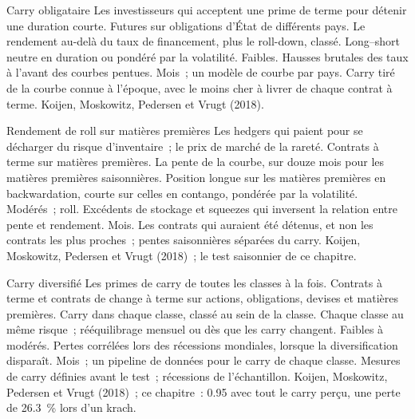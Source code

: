 \begin{strategyfile}{Carry obligataire}\label{strat:s1:carry-across-asset-classes:bond}
 Les investisseurs qui acceptent une prime de terme pour détenir une duration courte.
 Futures sur obligations d'État de différents pays.
 Le rendement au-delà du taux de financement, plus le roll-down, classé.
 Long--short neutre en duration ou pondéré par la volatilité.
 Faibles.
 Hausses brutales des taux à l'avant des courbes pentues.
 Mois~; un modèle de courbe par pays.
 Carry tiré de la courbe connue à l'époque, avec le moins cher à livrer de chaque contrat à terme.
 Koijen, Moskowitz, Pedersen et Vrugt (2018).
\end{strategyfile}

\begin{strategyfile}{Rendement de roll sur matières premières}\label{strat:s1:carry-across-asset-classes:commodity}
 Les hedgers qui paient pour se décharger du risque d'inventaire~; le prix de marché de la rareté.
 Contrats à terme sur matières premières.
 La pente de la courbe, sur douze mois pour les matières premières saisonnières.
 Position longue sur les matières premières en backwardation, courte sur celles en contango, pondérée par la volatilité.
 Modérés~; roll.
 Excédents de stockage et squeezes qui inversent la relation entre pente et rendement.
 Mois.
 Les contrats qui auraient été détenus, et non les contrats les plus proches~; pentes saisonnières séparées du carry.
 Koijen, Moskowitz, Pedersen et Vrugt (2018)~; le test saisonnier de ce chapitre.
\end{strategyfile}

\begin{strategyfile}{Carry diversifié}\label{strat:s1:carry-across-asset-classes:diversified}
 Les primes de carry de toutes les classes à la fois.
 Contrats à terme et contrats de change à terme sur actions, obligations, devises et matières premières.
 Carry dans chaque classe, classé au sein de la classe.
 Chaque classe au même risque~; rééquilibrage mensuel ou dès que les carry changent.
 Faibles à modérés.
 Pertes corrélées lors des récessions mondiales, lorsque la diversification disparaît.
 Mois~; un pipeline de données pour le carry de chaque classe.
 Mesures de carry définies avant le test~; récessions de l'échantillon.
 Koijen, Moskowitz, Pedersen et Vrugt (2018)~; ce chapitre~: 0.95 avec tout le carry perçu, une perte de 26.3~\% lors d'un krach.
\end{strategyfile}

